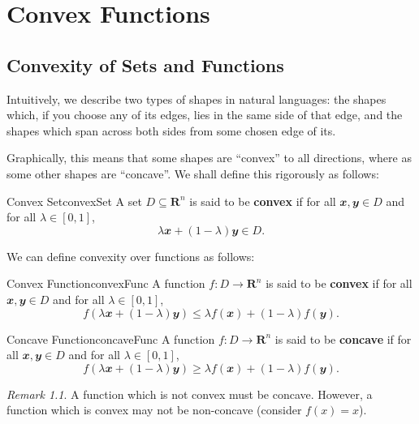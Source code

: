 \documentclass[math, code]{amznotes}
\theoremstyle{remark}
\newtheorem*{remark}{Remark}
\begin{document}
\chapter{Convex Functions}
\section{Convexity of Sets and Functions}
Intuitively, we describe two types of shapes in natural languages: the shapes which, if you choose any of its edges, lies in the same side of that edge, and the shapes which span across both sides from some chosen edge of its.

Graphically, this means that some shapes are ``convex'' to all directions, where as some other shapes are ``concave''. We shall define this rigorously as follows:
\begin{dfnbox}{Convex Set}{convexSet}
    A set $D \subseteq \mathbf{R}^n$ is said to be {\color{red} \textbf{convex}} if for all $\mathbfit{x}, \mathbfit{y} \in D$ and for all $\lambda \in [0, 1]$, 
    \begin{displaymath}
        \lambda \mathbfit{x} + (1 - \lambda)\mathbfit{y} \in D.
    \end{displaymath}
\end{dfnbox}
We can define convexity over functions as follows:
\begin{dfnbox}{Convex Function}{convexFunc}
    A function $f \colon D \to \mathbf{R}^n$ is said to be {\color{red} \textbf{convex}} if for all $\mathbfit{x}, \mathbfit{y} \in D$ and for all $\lambda \in [0, 1]$, 
    \begin{displaymath}
        f\left(\lambda \mathbfit{x} + (1 - \lambda)\mathbfit{y}\right) \leq \lambda f(\mathbfit{x}) + (1 - \lambda)f(\mathbfit{y}).
    \end{displaymath}
\end{dfnbox}
\begin{dfnbox}{Concave Function}{concaveFunc}
    A function $f \colon D \to \mathbf{R}^n$ is said to be {\color{red} \textbf{concave}} if for all $\mathbfit{x}, \mathbfit{y} \in D$ and for all $\lambda \in [0, 1]$, 
    \begin{displaymath}
        f\left(\lambda \mathbfit{x} + (1 - \lambda)\mathbfit{y}\right) \geq \lambda f(\mathbfit{x}) + (1 - \lambda)f(\mathbfit{y}).
    \end{displaymath}
\end{dfnbox}
\begin{notebox}
    \begin{remark}
        A function which is not convex must be concave. However, a function which is convex may not be non-concave (consider $f(x) = x$).
    \end{remark}
\end{notebox}
\end{document}
